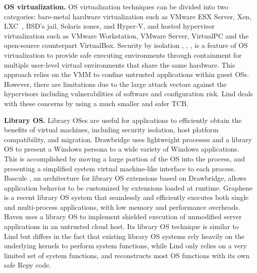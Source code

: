 \textbf{OS virtualization.}
OS virtualization techniques can be divided into two categories:
bare-metal hardware virtualization such as VMware ESX Server, Xen,
LXC~\cite{LXC}, BSD’s jail, Solaris zones, and Hyper-V, and 
hosted hypervisor virtualization such as VMware
Workstation, VMware Server, VirtualPC and the open-source counterpart
VirtualBox.
%
Security by isolation \cite{Qubes}, \cite{Overshadow},
\cite{SecureVM}, \cite{HypSec} is a feature of OS virtualization to
provide safe executing environments through containment for multiple
user-level virtual environments that share the same hardware. This
approach relies on the VMM to confine untrusted applications within
guest OSs. However, there are limitations due to
the large attack vectors against the hypervisors including
vulnerabilities of software and configuration risk. 
Lind deals with these concerns by using a much smaller and safer TCB.

\textbf{Library OS.}
Library OSes are useful for applications to efficiently
obtain the benefits of virtual machines,
including security isolation, host platform compatibility, and
migration. Drawbridge \cite{Drawbridge-11} 
uses lightweight processes and a library OS to present a Windows
persona to a wide variety of Windows applications.
This is accomplished by moving a large portion of the OS into the
process, and presenting a simplified system
virtual machine-like interface to each process. 
Bascule \cite{Bascule}, an architecture for library OS extensions
based on Drawbridge, allows application behavior to be customized by
extensions loaded at runtime.
Graphene \cite{Graphene-14} is a recent library OS system that
seamlessly and efficiently executes both single and
multi-process applications, with low memory and performance overheads.
Haven \cite{Haven} uses a library OS to implement
shielded execution of unmodified server applications
in an untrusted cloud host. 
Its library OS technique is similar to Lind but differs in the fact
that existing library OS systems rely heavily on
the underlying kernels to perform system functions, while Lind only
relies on a very limited set of system functions,
and reconstructs most OS functions with its own safe Repy code. 

